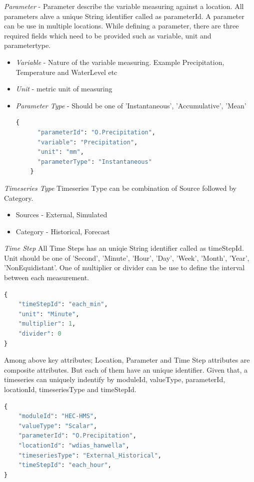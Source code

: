 \emph{Parameter} - Parameter describe the variable measuring against a location. All parameters ahve a unique String identifier called as parameterId. A parameter can be use in multiple locations.
While defining a parameter, there are three required fields which need to be provided such as variable, unit and parametertype.
\begin{itemize}  
  \item \emph{Variable} - Nature of the variable measuring. Example Precipitation, Temperature and WaterLevel etc
  \item \emph{Unit} - metric unit of measuring
  \item \emph{Parameter Type} - Should be one of 'Instantaneous', 'Accumulative', 'Mean'
  \begin{lstlisting}[language=Python]
    {
      "parameterId": "O.Precipitation",
      "variable": "Precipitation",
      "unit": "mm",
      "parameterType": "Instantaneous"
    }
  \end{lstlisting}
\end{itemize}

\emph{Timeseries Type}
Timeseries Type can be combination of Source followed by Category.
\begin{itemize}
  \item Sources - External, Simulated
  \item Category - Historical, Forecast
\end{itemize}

\emph{Time Step}
All Time Steps has an uniqie String identifier called as timeStepId. Unit should be one of 'Second', 'Minute', 'Hour', 'Day', 'Week', 'Month', 'Year', 'NonEquidistant'. One of multiplier or divider can be use to define the interval between each measurement.
\begin{lstlisting}[language=Python]
{
    "timeStepId": "each_min",
    "unit": "Minute",
    "multiplier": 1,
    "divider": 0
}
\end{lstlisting}

Among above key attributes; Location, Parameter and Time Step attributes are composite attributes. But each of them have an unique identifier.
Given that, a timeseries can uniquely indentify by moduleId, valueType, parameterId, locationId, timeseriesType and timeStepId.
\begin{lstlisting}[language=Python]
{
	"moduleId": "HEC-HMS",
	"valueType": "Scalar",
	"parameterId": "O.Precipitation",
	"locationId": "wdias_hanwella",
	"timeseriesType": "External_Historical",
	"timeStepId": "each_hour",
}
\end{lstlisting}

